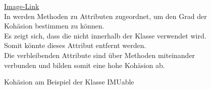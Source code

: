\begin{figure}[ht!]
\vspace{0.25cm}
\begin{center}
\caption{Kohäsion am Beispiel der Klasse IMUable}
\label{fig:Cohe}
\end{center}

\vspace{0.25cm}
\href{https://github.com/MaagMich/SWE2_Project/blob/c5c3674bd201ee306463881cf711bb2ce9229842/Ausarbeitung/Pictures/Cohesion_IMUable.png}{Image-Link}\\
In  werden Methoden zu Attributen zugeordnet, um den Grad der Kohäsion bestimmen zu können.\\
Es zeigt sich, dass die  nicht innerhalb der Klasse verwendet wird. Somit könnte dieses Attribut entfernt werden.\\
Die verbleibenden Attribute sind über Methoden miteinander verbunden und bilden somit eine hohe Kohäsion ab.
\end{figure}









